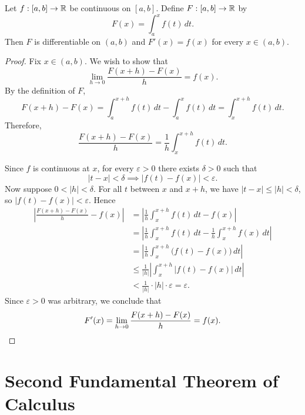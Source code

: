 \begin{theorem}
  \label{thm:ftc1}
  Let $f : [a,b] \to \mathbb{R}$ be continuous on $[a,b]$. Define $F : [a,b] \to \mathbb{R}$ by
  \[
    F(x) = \int_a^x f(t)\,dt.
  \]
  Then $F$ is differentiable on $(a,b)$ and $F'(x) = f(x)$ for every $x \in (a,b)$.
\end{theorem}
\begin{proof}
  Fix $x \in (a,b)$. We wish to show that
  \[
    \lim_{h \to 0} \frac{F(x+h) - F(x)}{h} = f(x).
  \]
  By the definition of $F$,
  \[
    F(x+h) - F(x) = \int_a^{x+h} f(t)\,dt - \int_a^x f(t)\,dt = \int_x^{x+h} f(t)\,dt.
  \]
  Therefore,
  \[
    \frac{F(x+h) - F(x)}{h} = \frac{1}{h}\int_x^{x+h} f(t)\,dt.
  \]

  Since $f$ is continuous at $x$, for every $\varepsilon > 0$ there exists $\delta > 0$ such that
  \[
    |t - x| < \delta \implies |f(t) - f(x)| < \varepsilon.
  \]
  Now suppose $0 < |h| < \delta$. For all $t$ between $x$ and $x+h$, we have
  $|t - x| \le |h| < \delta$, so $|f(t) - f(x)| < \varepsilon$. Hence
  \begin{align*}
    \left|\frac{F(x+h) - F(x)}{h} - f(x)\right|
    &= \left|\frac{1}{h}\int_x^{x+h} f(t)\,dt - f(x)\right| \\[6pt]
    &= \left|\frac{1}{h}\int_x^{x+h} f(t)\,dt - \frac{1}{h}\int_x^{x+h} f(x)\,dt\right| \\[6pt]
    &= \left|\frac{1}{h}\int_x^{x+h} \bigl(f(t) - f(x)\bigr)\,dt\right| \\[6pt]
    &\le \frac{1}{|h|}\left|\int_x^{x+h} |f(t) - f(x)|\,dt\right| \\[6pt]
    &< \frac{1}{|h|} \cdot |h| \cdot \varepsilon = \varepsilon.
  \end{align*}
  Since $\varepsilon > 0$ was arbitrary, we conclude that
  \[
    F'(x) = \lim_{h \to 0}\frac{F(x+h) - F(x)}{h} = f(x). \qedhere
  \]
\end{proof}

\section{Second Fundamental Theorem of Calculus}

